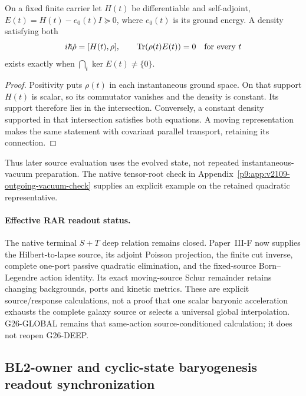 \documentclass[12pt,a4paper]{article}
\begin{document}
\begin{proposition}
\label{p9:prop:v2109-ground-history}
On a fixed finite carrier let \(H(t)\) be differentiable and self-adjoint,
\(E(t)=H(t)-e_0(t)I\succeq0\), where \(e_0(t)\) is its ground energy.
A density satisfying both
\[
 i\hbar\dot\rho=[H(t),\rho],\qquad
 \operatorname{Tr}(\rho(t)E(t))=0\quad\hbox{for every }t
\]
exists exactly when \(\bigcap_t\ker E(t)\ne\{0\}\).
\end{proposition}
\begin{proof}
Positivity puts \(\rho(t)\) in each instantaneous ground space.
On that support \(H(t)\) is scalar, so its commutator vanishes and the
density is constant.  Its support therefore lies in the intersection.
Conversely, a constant density supported in that intersection satisfies
both equations.  A moving representation makes the same statement with
covariant parallel transport, retaining its connection.
\end{proof}
Thus later source evaluation uses the evolved state, not repeated
instantaneous-vacuum preparation.  The native tensor-root check in
Appendix~\ref{p9:app:v2109-outgoing-vacuum-check} supplies an explicit
example on the retained quadratic representative.

\paragraph{Effective RAR readout status.}
The native terminal \(S+T\) deep relation remains closed.  Paper~III-F now
supplies the Hilbert-to-lapse source, its adjoint Poisson projection,
the finite cut inverse, complete one-port passive quadratic elimination,
and the fixed-source Born--Legendre action identity.  Its exact
moving-source Schur remainder retains changing backgrounds, ports and
kinetic metrics.  These are explicit source/response calculations, not a
proof that one scalar baryonic acceleration exhausts the complete galaxy
source or selects a universal global interpolation.  G26-GLOBAL remains
that same-action source-conditioned calculation; it does not reopen
G26-DEEP.




\subsection{BL2-owner and cyclic-state baryogenesis readout synchronization}
\label{p9:sec:v1109-baryogenesis-owner-state-sync}
\end{document}
